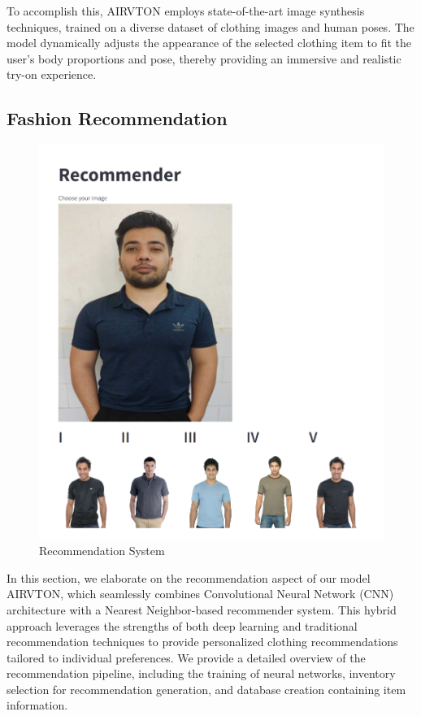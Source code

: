 	To accomplish this, AIRVTON employs state-of-the-art image synthesis techniques, trained on a diverse dataset of clothing images and human poses. The model dynamically adjusts the appearance of the selected clothing item to fit the user's body proportions and pose, thereby providing an immersive and realistic try-on experience.

\subsection{Fashion Recommendation}
    \begin{figure}[h!]
        \centering
        \includegraphics[width=1\textwidth]{components/images/recommender.png}
        \caption{Recommendation System}
        \label{fig:recomm}
    \end{figure}

    In this section, we elaborate on the recommendation aspect of our model AIRVTON, which seamlessly combines Convolutional Neural Network (CNN) architecture with a Nearest Neighbor-based recommender system. This hybrid approach leverages the strengths of both deep learning and traditional recommendation techniques to provide personalized clothing recommendations tailored to individual preferences. We provide a detailed overview of the recommendation pipeline, including the training of neural networks, inventory selection for recommendation generation, and database creation containing item information.

